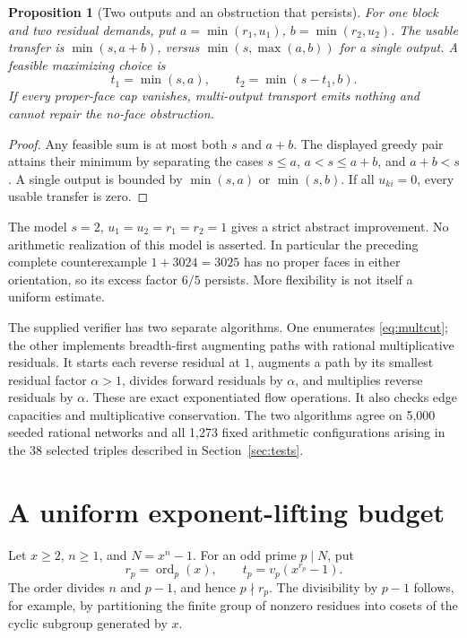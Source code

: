 \documentclass[11pt]{article}
\newtheorem{proposition}[theorem]{Proposition}
\theoremstyle{definition}\newtheorem{definition}[theorem]{Definition}
\theoremstyle{remark}\newtheorem{remark}[theorem]{Remark}
\newcommand{\ord}{\operatorname{ord}}
\begin{document}
\begin{proposition}[Two outputs and an obstruction that persists]
For one block and two residual demands, put \(a=\min(r_1,u_1)\), \(b=\min(r_2,u_2)\). The usable transfer is \(\min(s,a+b)\), versus \(\min(s,\max(a,b))\) for a single output. A feasible maximizing choice is
\[
 t_1=\min(s,a),\qquad t_2=\min(s-t_1,b).
\]
If every proper-face cap vanishes, multi-output transport emits nothing and cannot repair the no-face obstruction.
\end{proposition}
\begin{proof}
Any feasible sum is at most both \(s\) and \(a+b\). The displayed greedy pair attains their minimum by separating the cases \(s\le a\), \(a<s\le a+b\), and \(a+b<s\). A single output is bounded by \(\min(s,a)\) or \(\min(s,b)\). If all \(u_{ki}=0\), every usable transfer is zero.
\end{proof}
The model \(s=2\), \(u_1=u_2=r_1=r_2=1\) gives a strict abstract improvement. No arithmetic realization of this model is asserted. In particular the preceding complete counterexample \(1+3024=3025\) has no proper faces in either orientation, so its excess factor \(6/5\) persists. More flexibility is not itself a uniform estimate.

The supplied verifier has two separate algorithms. One enumerates \eqref{eq:multcut}; the other implements breadth-first augmenting paths with rational multiplicative residuals. It starts each reverse residual at \(1\), augments a path by its smallest residual factor \(\alpha>1\), divides forward residuals by \(\alpha\), and multiplies reverse residuals by \(\alpha\). These are exact exponentiated flow operations. It also checks edge capacities and multiplicative conservation. The two algorithms agree on 5,000 seeded rational networks and all 1,273 fixed arithmetic configurations arising in the 38 selected triples described in Section~\ref{sec:tests}.

\section{A uniform exponent-lifting budget}\label{sec:lift}
Let \(x\ge2\), \(n\ge1\), and \(N=x^n-1\). For an odd prime \(p\mid N\), put
\[
 r_p=\ord_p(x),\qquad t_p=v_p(x^{r_p}-1).
\]
The order divides \(n\) and \(p-1\), and hence \(p\nmid r_p\). The divisibility by \(p-1\) follows, for example, by partitioning the finite group of nonzero residues into cosets of the cyclic subgroup generated by \(x\).
\end{document}
